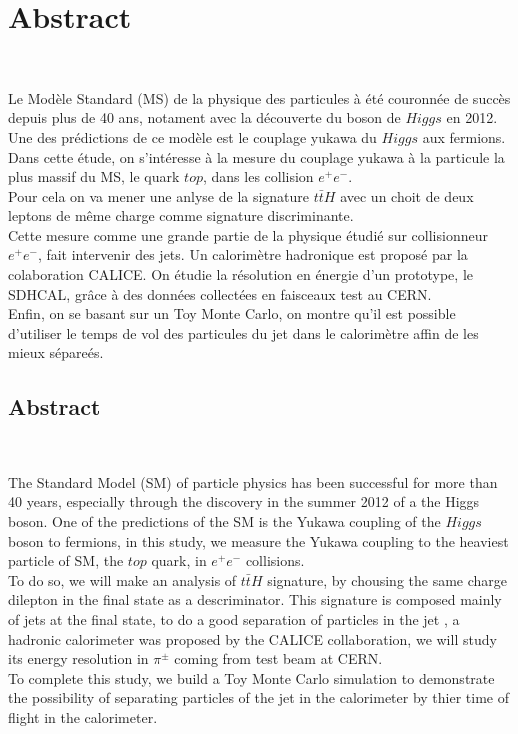 \section*{Abstract} %

~\par Le Mod\`ele Standard (MS) de la physique des particules \`a \'et\'e couronn\'ee de succ\`es depuis plus de 40 ans, notament avec la d\'ecouverte du boson de $Higgs$ en 2012. Une des pr\'edictions de ce mod\`ele est le couplage yukawa du $Higgs$ aux fermions. Dans cette \'etude, on s'intéresse à la mesure du couplage yukawa \`a la particule la plus massif du MS, le quark $top$, dans les collision $e^+e^-$.\\
Pour cela on va mener une anlyse de la signature $t\bar{t}H$ avec un choit de deux leptons de m\^eme charge comme signature discriminante.\\
Cette mesure comme une grande partie de la physique étudié sur collisionneur $e^+e^-$, fait intervenir des jets. Un calorimètre hadronique est proposé par la colaboration CALICE. On étudie la r\'esolution en \'energie d'un prototype, le SDHCAL, grâce à des données collectées en faisceaux test au CERN.\\
 Enfin, on se basant sur un Toy Monte Carlo, on montre qu'il est possible d'utiliser le temps de vol des particules du jet dans le calorim\`etre affin de les mieux s\'epareés.

\subsection*{Abstract}

~\par The Standard Model (SM) of particle physics has been successful for more than 40 years, especially through the discovery in the summer 2012 of a the Higgs boson. One of the predictions of the SM is the Yukawa coupling of the $Higgs$ boson to fermions, in this study, we measure the Yukawa coupling to the heaviest particle of SM, the $top$ quark, in $e^+e^-$ collisions.\\
To do so, we will make an analysis of $t\bar{t}H$ signature, by chousing the same charge dilepton in the final state as a descriminator. This signature is composed mainly of jets at the final state, to do a good separation of  particles in the jet , a hadronic calorimeter was proposed by the CALICE collaboration, we will study its energy resolution in $\pi^{\pm}$ coming from test beam at CERN.\\
 To complete this study, we build a Toy Monte Carlo simulation to demonstrate the possibility of separating particles of the jet in the calorimeter by thier time of flight in the calorimeter.
